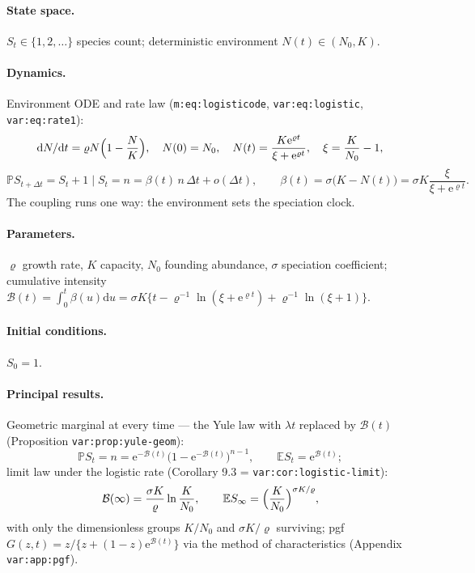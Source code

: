 \documentclass[11pt,a4paper]{article}
\newcommand{\PR}{\mathbb{P}}
\newcommand{\EX}{\mathbb{E}}
\newcommand{\ee}{\mathrm{e}}
\newcommand{\dd}{\mathrm{d}}
\begin{document}
\paragraph{State space.} $S_t\in\{1,2,\ldots\}$ species count;
deterministic environment $N(t)\in(N_0,K)$.

\paragraph{Dynamics.} Environment ODE and rate law
(\texttt{m:eq:logisticode}, \texttt{var:eq:logistic}, \texttt{var:eq:rate1}):
\[
\dd N/\dd t=\varrho N\Bigl(1-\frac NK\Bigr),\quad N(0)=N_0,\quad
N(t)=\frac{K\ee^{\varrho t}}{\xi+\ee^{\varrho t}},\quad\xi=\frac K{N_0}-1,
\]
\[
\PR{S_{t+\Delta t}=S_t+1\mid S_t=n}=\beta(t)\,n\,\Delta t+o(\Delta t),
\qquad
\beta(t)=\sigma\bigl(K-N(t)\bigr)=\sigma K\frac{\xi}{\xi+\ee^{\varrho t}} .
\]
The coupling runs one way: the environment sets the speciation clock.

\paragraph{Parameters.} $\varrho$ growth rate, $K$ capacity, $N_0$ founding
abundance, $\sigma$ speciation coefficient; cumulative intensity
$\mathcal B(t)=\int_0^t\beta(u)\dd u=
\sigma K\{t-\varrho^{-1}\ln(\xi+\ee^{\varrho t})+\varrho^{-1}\ln(\xi+1)\}$.

\paragraph{Initial conditions.} $S_0=1$.

\paragraph{Principal results.} Geometric marginal at every time --- the
Yule law with $\lambda t$ replaced by $\mathcal B(t)$ (Proposition
\texttt{var:prop:yule-geom}):
\[
\PR{S_t=n}=\ee^{-\mathcal B(t)}\bigl(1-\ee^{-\mathcal B(t)}\bigr)^{n-1},
\qquad \EX{S_t}=\ee^{\mathcal B(t)};
\]
limit law under the logistic rate (Corollary 9.3
= \texttt{var:cor:logistic-limit}):
\[
\mathcal B(\infty)=\frac{\sigma K}{\varrho}\ln\frac K{N_0},\qquad
\EX{S_\infty}=\Bigl(\frac K{N_0}\Bigr)^{\sigma K/\varrho},
\]
with only the dimensionless groups $K/N_0$ and $\sigma K/\varrho$
surviving; pgf $G(z,t)=z/\{z+(1-z)\ee^{\mathcal B(t)}\}$ via the method of
characteristics (Appendix \texttt{var:app:pgf}).
\end{document}
